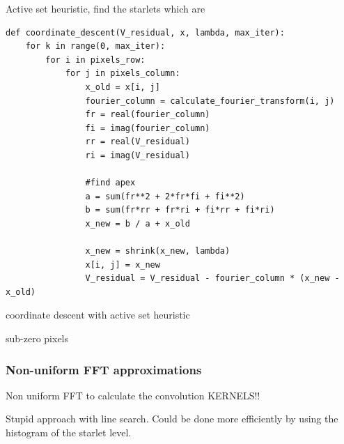 Active set heuristic, find the starlets which are 

\begin{lstlisting} 
def coordinate_descent(V_residual, x, lambda, max_iter):
	for k in range(0, max_iter):
		for i in pixels_row:
			for j in pixels_column:
				x_old = x[i, j]
				fourier_column = calculate_fourier_transform(i, j)
				fr = real(fourier_column)
				fi = imag(fourier_column)
				rr = real(V_residual)
				ri = imag(V_residual)
				
				#find apex
				a = sum(fr**2 + 2*fr*fi + fi**2)
				b = sum(fr*rr + fr*ri + fi*rr + fi*ri)
				x_new = b / a + x_old
				
				x_new = shrink(x_new, lambda)
				x[i, j] = x_new
				V_residual = V_residual - fourier_column * (x_new - x_old)
\end{lstlisting}\label{cd:implementation}

coordinate descent with active set heuristic


sub-zero pixels

\subsubsection{Non-uniform FFT approximations}
Non uniform FFT to calculate the convolution KERNELS!!


Stupid approach with line search. Could be done more efficiently by using the histogram of the starlet level.


